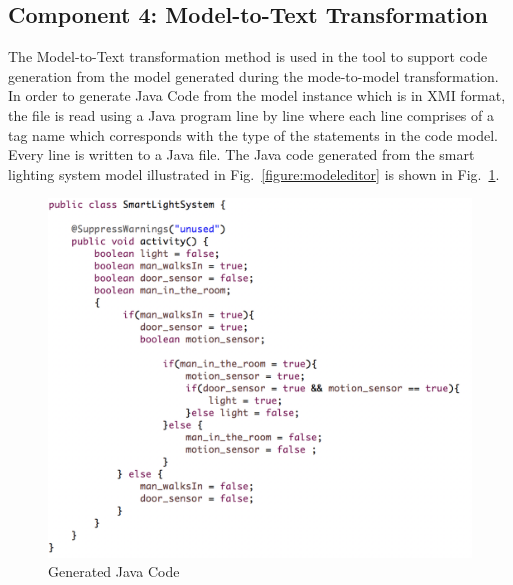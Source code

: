 \subsection{Component 4: Model-to-Text Transformation}

The Model-to-Text transformation method is used in the tool to support code generation from the model generated during the mode-to-model transformation. In order to generate Java Code from the model instance which is in XMI format, the file is read using a Java program line by line where each line comprises of a tag name which corresponds with the type of the statements in the code model. Every line is written to a Java file. The Java code generated from the smart lighting system model illustrated in Fig.~\ref{figure:modeleditor} is shown in Fig.~\ref{figure:Generated_Java_Code}.

\begin{figure}[!h]
	\includegraphics[width=\textwidth]{figs/Generated_Java_Code}
	\caption{Generated Java Code}
	\label{figure:Generated_Java_Code}
\end{figure}



